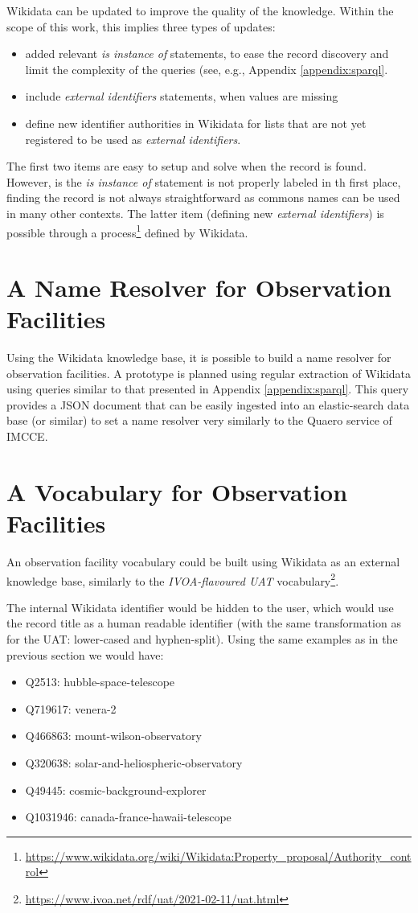 \documentclass[11pt,a4paper]{ivoa}
\begin{document}
Wikidata can be updated to improve the quality of the knowledge.
Within the scope of this work, this implies three types of updates:
\begin{itemize}
\item added relevant \emph{is instance of} statements, to ease the 
record discovery and limit the complexity of the queries (see, e.g., 
Appendix \ref{appendix:sparql}. 
\item include \emph{external identifiers} statements, when values 
are missing
\item define new identifier authorities in Wikidata for lists that 
are not yet registered to be used as \emph{external identifiers}. 
\end{itemize}
The first two items are easy to setup and solve when the record is 
found. However, is the \emph{is instance of} statement is not 
properly labeled in th first place, finding the record is not always 
straightforward as commons names can be used in many other contexts. 
The latter item (defining new \emph{external identifiers}) is 
possible through a process\footnote{\url{https://www.wikidata.org/wiki/Wikidata:Property_proposal/Authority_control}}
defined by Wikidata. 

\section{A Name Resolver for Observation Facilities}
Using the Wikidata knowledge base, it is possible to build a name
resolver for observation facilities. A prototype is planned using 
regular extraction of Wikidata using queries similar to that 
presented in Appendix \ref{appendix:sparql}. This query provides
a JSON document that can be easily ingested into an elastic-search
data base (or similar) to set a name resolver very similarly to 
the Quaero service of IMCCE. 

\section{A Vocabulary for Observation Facilities}
An observation facility vocabulary could be built using Wikidata
as an external knowledge base, similarly to the \emph{IVOA-flavoured 
UAT} vocabulary\footnote{\url{https://www.ivoa.net/rdf/uat/2021-02-11/uat.html}}.

The internal Wikidata identifier would be hidden to the user, which 
would use the record title as a human readable identifier (with the 
same transformation as for the UAT: lower-cased and hyphen-split). 
Using the same examples as in the previous section we would have: 
\begin{itemize}
\item Q2513: hubble-space-telescope
\item Q719617: venera-2
\item Q466863: mount-wilson-observatory
\item Q320638: solar-and-heliospheric-observatory
\item Q49445: cosmic-background-explorer
\item Q1031946: canada-france-hawaii-telescope
\end{itemize}
\end{document}
